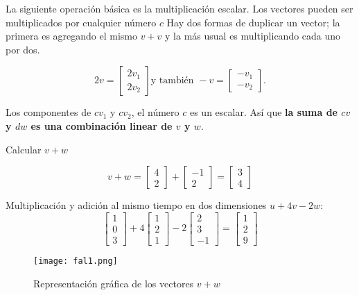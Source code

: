 La siguiente operación básica es la multiplicación escalar. Los vectores pueden ser multiplicados por cualquier número $c$
Hay dos formas de duplicar un vector; la primera es agregando el mismo $v+v$ y la más usual es multiplicando cada uno por dos.

\begin{equation}
	2v=\begin{bmatrix}
		2v_1\\
		2v_2 
	\end{bmatrix} \text{y también } -v= \begin{bmatrix}
		-v_1\\
		-v_2 
	\end{bmatrix}.
\end{equation}

\begin{example}
	Los componentes de $cv_{1}$ y $cv_2 $, el número $c$ es un escalar. Así que \textbf{la suma de $cv$ y $dw$ es una combinación linear
		de $v$ y $w$}.

	Calcular $v+w$

	\begin{equation*}
		v+w= \begin{bmatrix}
			4 \\
			2
		\end{bmatrix} + \begin{bmatrix}
			-1 \\
			2
		\end{bmatrix} = \begin{bmatrix}
			3 \\
			4
		\end{bmatrix}
	\end{equation*}

\end{example}

Multiplicación y adición al mismo tiempo en dos dimensiones $u+4v-2w$:
\begin{equation*}
	\begin{bmatrix} 1\\ 0\\ 3 \end{bmatrix}+4\begin{bmatrix} 1\\ 2\\ 1 \end{bmatrix}-2\begin{bmatrix} 2\\ 3\\ -1 \end{bmatrix}=\begin{bmatrix} 1\\ 2\\ 9 \end{bmatrix}
\end{equation*}
\begin{figure}[h!]
	\centerline{\texttt{[image: fal1.png]}}
	\caption{ Representación gráfica de los vectores $v+w$}
	\label{fal1}
\end{figure}

